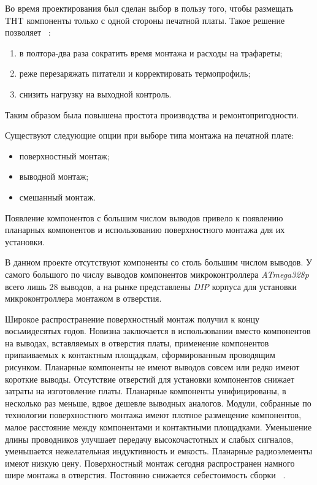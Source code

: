 
Во время проектирования был сделан выбор в пользу того, чтобы размещать
THT компоненты только с одной стороны печатной платы.
Такое решение позволяет ~\cite{yadro-habr-764056}:
\begin{enumerate}
\item в полтора-два раза сократить время монтажа и расходы на трафареты;
\item реже перезаряжать питатели и корректировать термопрофиль;  
\item снизить нагрузку на выходной контроль.
\end{enumerate}

Таким образом была повышена простота производства и ремонтопригодности.

Существуют следующие опции при выборе типа монтажа на печатной плате:
\begin{itemize}
\item поверхностный монтаж;
\item выводной монтаж;
\item смешанный монтаж.
\end{itemize}

Появление компонентов с большим числом выводов привело к появлению
планарных компонентов и использованию поверхностного монтажа для их
установки.

В данном проекте отсутствуют компоненты со столь большим числом
выводов. У самого большого по числу выводов компонентов
микроконтроллера \textit{ATmega328p} всего лишь 28 выводов, а на рынке
представлены \textit{DIP} корпуса для установки микроконтроллера
монтажом в отверстия.

Широкое распространение поверхностный монтаж получил к концу
восьмидесятых годов. Новизна заключается в использовании вместо
компонентов на выводах, вставляемых в отверстия платы, применение
компонентов припаиваемых к контактным площадкам, сформированным
проводящим рисунком. Планарные компоненты не имеют выводов совсем или
редко имеют короткие выводы. Отсутствие отверстий для установки
компонентов снижает затраты на изготовление платы. Планарные
компоненты унифицированы, в несколько раз меньше, вдвое дешевле
выводных аналогов. Модули, собранные по технологии поверхностного
монтажа имеют плотное размещение компонентов, малое расстояние между
компонентами и контактными площадками. Уменьшение длины проводников
улучшает передачу высокочастотных и слабых сигналов, уменьшается
нежелательная индуктивность и емкость. Планарные радиоэлементы имеют
низкую цену. Поверхностный монтаж сегодня распространен намного шире
монтажа в отверстия. Постоянно снижается себестоимость сборки
~\cite{платы.рф-монтаж}.


